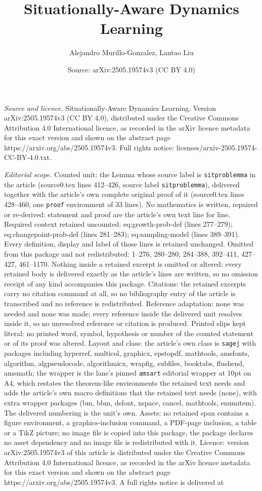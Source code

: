 \documentclass[10pt,a4paper]{amsart}
\title[Situationally-Aware Dynamics Learning]{Situationally-Aware Dynamics Learning}
\author{Alejandro Murillo-Gonzalez, Lantao Liu}
\date{Source: arXiv:2505.19574v3 (CC BY 4.0)}
\begin{document}
\maketitle

\noindent\emph{Source and licence.} Situationally-Aware Dynamics Learning. Version arXiv:2505.19574v3 (CC BY 4.0), distributed under the Creative Commons Attribution 4.0 International licence, as recorded in the arXiv licence metadata for this exact version and shown on the abstract page https://arxiv.org/abs/2505.19574v3. Full rights notice: licenses/arxiv-2505.19574-CC-BY-4.0.txt.\par\smallskip

\noindent\textit{Editorial scope.} Counted unit: the Lemma whose source label is \texttt{sitproblemma} in the article (source0.tex lines 412--426, source label \texttt{sitproblemma}), delivered together with the article's own complete original proof of it (source0.tex lines 428--460, one \texttt{proof} environment of 33 lines). No mathematics is written, repaired or re-derived: statement and proof are the article's own text line for line. Required context retained uncounted: eq:growth-prob-def (lines 277--279); eq:changepoint-prob-def (lines 281--283); eq:sampling-model (lines 389--391). Every definition, display and label of those lines is retained unchanged. Omitted from this package and not redistributed: 1--276, 280--280, 284--388, 392--411, 427--427, 461--1170. Nothing inside a retained excerpt is omitted or altered: every retained body is delivered exactly as the article's lines are written, so no omission receipt of any kind accompanies this package. Citations: the retained excerpts carry no citation command at all, so no bibliography entry of the article is transcribed and no reference is redistributed. Reference adaptation: none was needed and none was made; every reference inside the delivered unit resolves inside it, so no unresolved reference or citation is produced. Printed slips kept literal: no printed word, symbol, hypothesis or number of the counted statement or of its proof was altered. Layout and class: the article's own class is \texttt{sagej} with packages including hyperref, multicol, graphicx, epstopdf, mathtools, amsfonts, algorithm, algpseudocode, algorithmicx, wrapfig, subfiles, booktabs, flushend, amsmath; the wrapper is the lane's pinned \texttt{amsart} editorial wrapper at 10pt on A4, which restates the theorem-like environments the retained text needs and adds the article's own macro definitions that the retained text needs (none), with extra wrapper packages (bm, bbm, dsfont, xspace, cancel, mathtools, enumitem). The delivered numbering is the unit's own. Assets: no retained span contains a figure environment, a graphics-inclusion command, a PDF-page inclusion, a table or a TikZ picture; no image file is copied into this package, the package declares no asset dependency and no image file is redistributed with it. Licence: version arXiv:2505.19574v3 of this article is distributed under the Creative Commons Attribution 4.0 International licence, as recorded in the arXiv licence metadata for this exact version and shown on the abstract page https://arxiv.org/abs/2505.19574v3. A full rights notice is delivered at 
\end{document}
